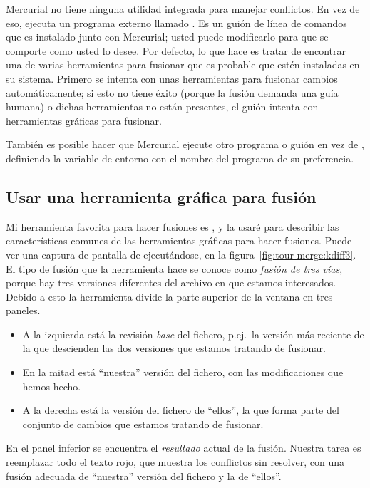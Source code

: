 Mercurial no tiene ninguna utilidad integrada para manejar conflictos.
En vez de eso, ejecuta un programa externo llamado .
Es un guión de línea de comandos que es instalado junto con Mercurial;
usted puede modificarlo para que se comporte como usted lo desee. Por
defecto, lo que hace es tratar de encontrar una de varias herramientas
para fusionar que es probable que estén instaladas en su sistema.
Primero se intenta con unas herramientas para fusionar cambios
automáticamente; si esto no tiene éxito (porque la fusión demanda
una guía humana) o dichas herramientas no están presentes, el guión
intenta con herramientas gráficas para fusionar.

También es posible hacer que Mercurial ejecute otro programa o guión
en vez de , definiendo la variable de entorno
 con el nombre del programa de su preferencia.

\subsection{Usar una herramienta gráfica para fusión}

Mi herramienta favorita para hacer fusiones es , y la
usaré para describir las características comunes de las herramientas
gráficas para hacer fusiones. Puede ver una captura de pantalla de
 ejecutándose, en la
figura~\ref{fig:tour-merge:kdiff3}.  El tipo de fusión que la
herramienta hace se conoce como \emph{fusión de tres vías}, porque hay
tres versiones diferentes del archivo en que estamos interesados.
Debido a esto la herramienta divide la parte superior de la ventana en
tres paneles.
\begin{itemize}
\item A la izquierda está la revisión \emph{base} del fichero, p.ej.~la
    versión más reciente de la que descienden las dos versiones que
    estamos tratando de fusionar.
\item En la mitad está ``nuestra'' versión del fichero, con las
    modificaciones que hemos hecho.
\item A la derecha está la versión del fichero de ``ellos'', la que
    forma parte del conjunto de cambios que estamos tratando de
    fusionar.
\end{itemize}
En el panel inferior se encuentra el \emph{resultado} actual de la
fusión. Nuestra tarea es reemplazar todo el texto rojo, que muestra
los conflictos sin resolver, con una fusión adecuada de ``nuestra''
versión del fichero y la de ``ellos''.

